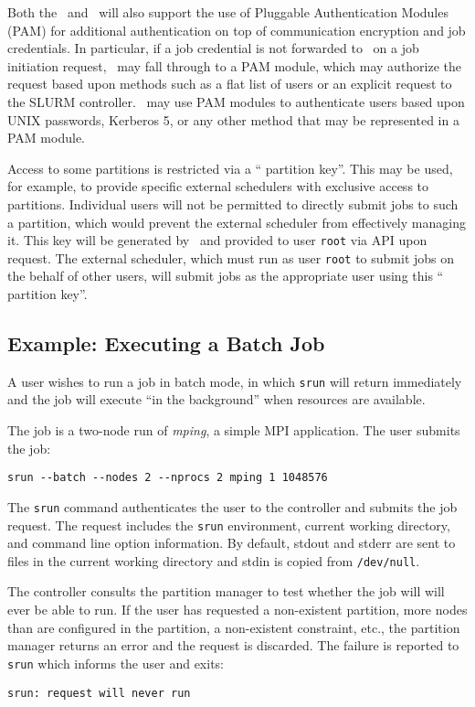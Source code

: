 Both the \slurmd\ and \slurmctld\ will also support the use
of Pluggable Authentication Modules (PAM) for additional authentication on
top of communication encryption and job credentials. In particular, if a
job credential is not forwarded to \slurmd\ on a job initiation request,
\slurmd\ may fall through to a PAM module, which may authorize the request
based upon methods such as a flat list of users or an explicit request
to the SLURM controller. \slurmctld\ may use PAM modules to authenticate
users based upon UNIX passwords, Kerberos 5, or any other method that
may be represented in a PAM module.

Access to some partitions is restricted via a `` partition key''.  This may be used,
for example, to provide specific external schedulers with exclusive access
to partitions.  Individual users will not be permitted to directly submit
jobs to such a partition, which would prevent the external scheduler
from effectively managing it.  This key will be generated by \slurmctld\
and provided to user {\tt root} via API upon request.  The external scheduler,
which must run as user {\tt root} to submit jobs on the behalf of other
users, will submit jobs as the appropriate user using this `` partition key''.

\subsection{Example:  Executing a Batch Job}

A user wishes to run a job in batch mode, in which {\tt srun} will return 
immediately and the job will execute ``in the background'' when resources
are available.

The job is a two-node run of {\em mping}, a simple MPI application.
The user submits the job:
\begin{verbatim}
srun --batch --nodes 2 --nprocs 2 mping 1 1048576
\end{verbatim}

The {\tt srun} command authenticates the user to the controller and submits
the job request. 
The request includes the {\tt srun} environment, current working directory, 
and command line option information. By default, stdout and stderr are
sent to files in the current working directory and stdin is copied from
{\tt /dev/null}.

The controller consults the partition manager to test whether the job will
will ever be able to run.  If the user has requested a non-existent partition,
more nodes than are configured in the partition, a non-existent constraint, 
etc., the partition manager returns an error and the request is discarded.
The failure is reported to {\tt srun} which informs the user and exits:
\begin{verbatim}
srun: request will never run
\end{verbatim}

